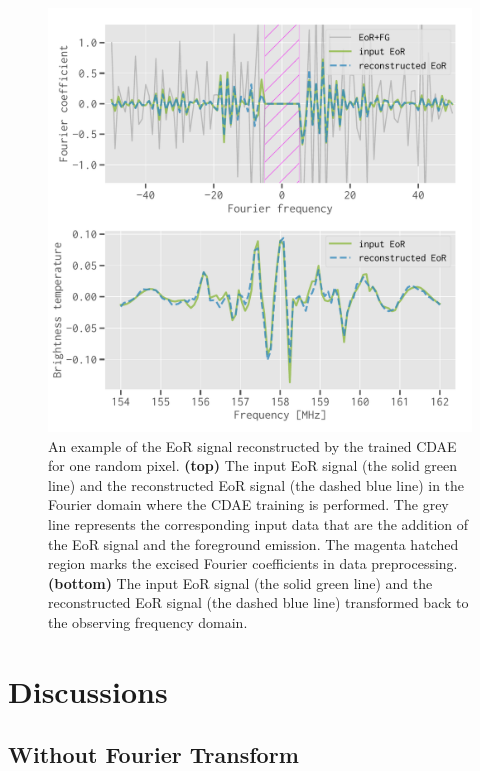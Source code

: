 \documentclass[letters,fleqn,usenatbib,onecolumn]{mnras}
\begin{document}
\begin{figure}
  \centering
  \includegraphics[width=\myfigwidth]{eor-result}
  \caption{\label{fig:result}%
    An example of the EoR signal reconstructed by the trained CDAE for
    one random pixel.
    \textbf{(top)} The input EoR signal (the solid green line) and the
    reconstructed EoR signal (the dashed blue line) in the Fourier domain
    where the CDAE training is performed.
    The grey line represents the corresponding input data that are the
    addition of the EoR signal and the foreground emission.
    The magenta hatched region marks the excised Fourier coefficients
    in data preprocessing.
    \textbf{(bottom)} The input EoR signal (the solid green line) and
    the reconstructed EoR signal (the dashed blue line) transformed back
    to the observing frequency domain.
  }
\end{figure}


\section{Discussions}
\label{sec:discussions}

\subsection{Without Fourier Transform}
\label{sec:noft}
\end{document}
